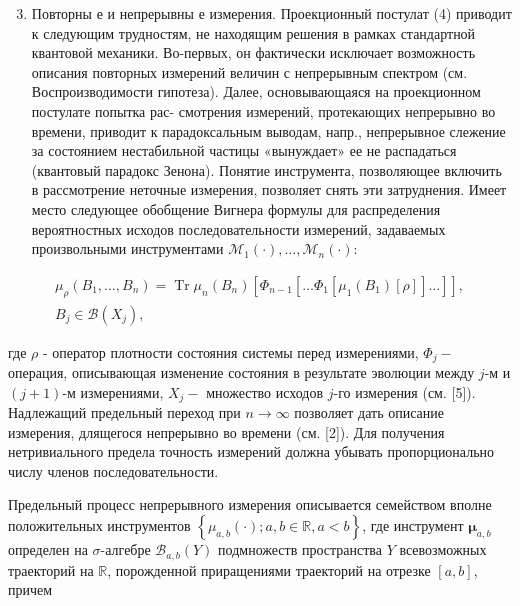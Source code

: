 \documentclass[10pt]{article}
\begin{document}
\begin{enumerate}

  \setcounter{enumi}{2}

  \item Повторны е и непрерывны е измерения. Проекционный постулат (4) приводит к следующим трудностям, не находящим решения в рамках стандартной квантовой механики. Во-первых, он фактически исключает возможность описания повторных измерений величин с непрерывным спектром (см. Воспроизводимости гипотеза). Далее, основывающаяся на проекционном постулате попытка рас- смотрения измерений, протекающих непрерывно во времени, приводит к парадоксальным выводам, напр., непрерывное слежение за состоянием нестабильной частицы «вынуждает» ее не распадаться (квантовый парадокс Зенона). Понятие инструмента, позволяющее включить в рассмотрение неточные измерения, позволяет снять эти затруднения. Имеет место следующее обобщение Вигнера формулы для распределения вероятностных исходов последовательности измерений, задаваемых произвольными инструментами $\mathscr{M}_{1}(\cdot), \ldots, \mathscr{M}_{n}(\cdot):$

\end{enumerate}



\[

\begin{gathered}

\mu_{\rho}\left(B_{1}, \ldots, B_{n}\right)=\operatorname{Tr} \mu_{n}\left(B_{n}\right)\left[\Phi_{n-1}\left[\ldots \Phi_{1}\left[\mu_{1}\left(B_{1}\right)[\rho]\right] \ldots\right]\right], \\

B_{j} \in \mathscr{B}\left(X_{j}\right),

\end{gathered}

\]



где $\rho$ - оператор плотности состояния системы перед измерениями, $\Phi_{j}-$ операция, описывающая изменение состояния в результате эволюции между $j$-м и $(j+1)$-м измерениями, $X_{j}-$ множество исходов $j$-го измерения (см. [5]). Надлежащий предельный переход при $n \rightarrow \infty$ позволяет дать описание измерения, длящегося непрерывно во времени (см. [2]). Для получения нетривиального предела точность измерений должна убывать пропорционально числу членов последовательности.



Предельный процесс непрерывного измерения описывается семейством вполне положительных инструментов $\left\{\mu_{a, b}(\cdot) ; a, b \in \mathbb{R}, a<b\right\}$, где инструмент $\boldsymbol{\mu}_{a, b}$ определен на $\sigma$-алгебре $\mathscr{B}_{a, b}(Y)$ подмножеств пространства $Y$ всевозможных траекторий на $\mathbb{R}$, порожденной приращениями траекторий на отрезке $[a, b]$, причем
\end{document}
